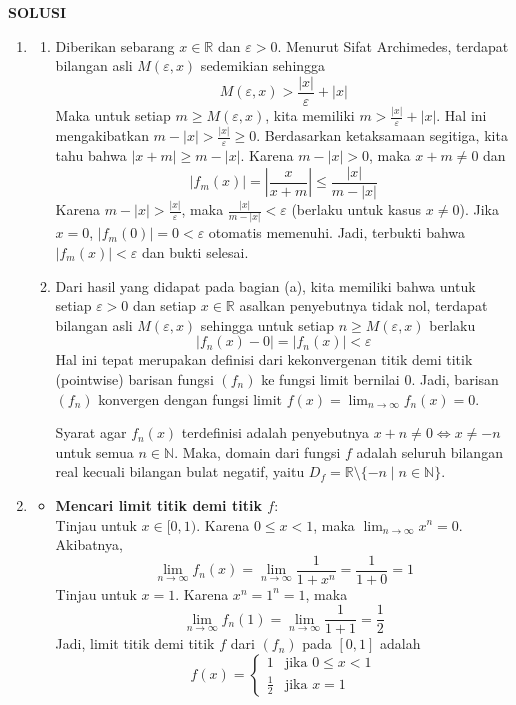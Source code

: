\documentclass[12pt,openany,a4paper]{article}
\newcommand{\R}{\mathbb{R}}
\newcommand{\N}{\mathbb{N}}
\begin{document}
\newpage
\textbf{SOLUSI}
\begin{enumerate}
    \item 
    \begin{enumerate}[label=(\alph*)]
        \item Diberikan sebarang $x \in \R$ dan $\varepsilon > 0$. 
        Menurut Sifat Archimedes, terdapat bilangan asli $M(\varepsilon, x)$ sedemikian sehingga 
        \[ M(\varepsilon, x) > \frac{|x|}{\varepsilon} + |x| \]
        Maka untuk setiap $m \ge M(\varepsilon, x)$, kita memiliki $m > \frac{|x|}{\varepsilon} + |x|$. 
        Hal ini mengakibatkan $m - |x| > \frac{|x|}{\varepsilon} \ge 0$. 
        Berdasarkan ketaksamaan segitiga, kita tahu bahwa $|x+m| \ge m - |x|$. Karena $m - |x| > 0$, maka $x+m \neq 0$ dan
        \[ |f_m(x)| = \left| \frac{x}{x+m} \right| \le \frac{|x|}{m - |x|} \]
        Karena $m - |x| > \frac{|x|}{\varepsilon}$, maka $\frac{|x|}{m - |x|} < \varepsilon$ (berlaku untuk kasus $x \ne 0$). Jika $x=0$, $|f_m(0)| = 0 < \varepsilon$ otomatis memenuhi.
        Jadi, terbukti bahwa $|f_m(x)| < \varepsilon$ dan bukti selesai.
        
        \item Dari hasil yang didapat pada bagian (a), kita memiliki bahwa untuk setiap $\varepsilon > 0$ dan setiap $x \in \R$ asalkan penyebutnya tidak nol, terdapat bilangan asli $M(\varepsilon, x)$ sehingga untuk setiap $n \ge M(\varepsilon, x)$ berlaku
        \[|f_n(x) - 0| = |f_n(x)| < \varepsilon\]
        Hal ini tepat merupakan definisi dari kekonvergenan titik demi titik (pointwise) barisan fungsi $(f_n)$ ke fungsi limit bernilai $0$. 
        Jadi, barisan $(f_n)$ konvergen dengan fungsi limit $f(x) = \lim_{n\to\infty} f_n(x) = 0$.
        
        Syarat agar $f_n(x)$ terdefinisi adalah penyebutnya $x+n \neq 0 \iff x \neq -n$ untuk semua $n \in \N$.
        Maka, domain dari fungsi $f$ adalah seluruh bilangan real kecuali bilangan bulat negatif, yaitu $D_f = \R \setminus \{-n \mid n \in \N\}$.
    \end{enumerate}
    
    \item 
    \begin{itemize}
        \item \textbf{Mencari limit titik demi titik $f$}:\\
        Tinjau untuk $x \in [0,1)$. Karena $0 \le x < 1$, maka $\lim_{n \to \infty} x^n = 0$. Akibatnya,
        \[\lim_{n \to \infty} f_n(x) = \lim_{n \to \infty} \frac{1}{1+x^n} = \frac{1}{1+0} = 1\]
        Tinjau untuk $x = 1$. Karena $x^n = 1^n = 1$, maka
        \[\lim_{n \to \infty} f_n(1) = \lim_{n \to \infty} \frac{1}{1+1} = \frac{1}{2}\]
        Jadi, limit titik demi titik $f$ dari $(f_n)$ pada $[0,1]$ adalah
        \[f(x) = \begin{cases} 1 & \text{jika } 0 \le x < 1 \\ \frac{1}{2} & \text{jika } x = 1 \end{cases}\]
        

\end{itemize}
\end{enumerate}
\end{document}
